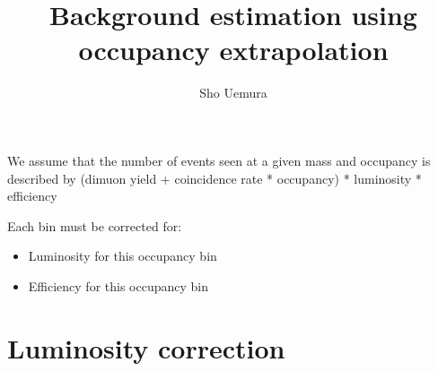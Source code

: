 \documentclass{article}
\author{Sho Uemura}
\title{Background estimation using occupancy extrapolation}
\date{}
\begin{document}
\maketitle

We assume that the number of events seen at a given mass and occupancy is described by 
(dimuon yield + coincidence rate * occupancy) * luminosity * efficiency

Each bin must be corrected for:
\begin{itemize}
\item Luminosity for this occupancy bin
\item Efficiency for this occupancy bin
\end{itemize}

\section{Luminosity correction}
\end{document}
